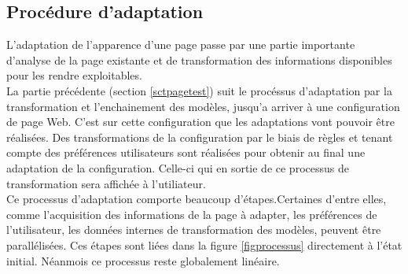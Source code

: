 \documentclass[french,a4paper]{report}
\begin{document}
{\subsection{Procédure d'adaptation}
L'adaptation de l'apparence d'une page passe par une partie importante
d'analyse de la page existante et de transformation des informations
disponibles pour les rendre exploitables.\\
La partie précédente (section \ref{sctpagetest}) suit le procéssus d'adaptation
par la transformation et l'enchainement des modèles, jusqu'a arriver à une configuration
de page Web. C'est sur cette configuration que les adaptations vont pouvoir être réalisées.
Des transformations de la configuration par le biais de règles et tenant compte des
préférences utilisateurs sont réalisées pour obtenir au final une adaptation de la
configuration. Celle-ci qui en sortie de ce processus de transformation sera affichée à
l'utiliateur.\\
Ce processus d'adaptation comporte beaucoup d'étapes.Certaines d'entre elles, comme l'acquisition
des informations de la page à adapter, les préférences de l'utilisateur, les données internes de
transformation des modèles, peuvent être parallélisées. Ces étapes sont liées dans la figure
\ref{figprocessus} directement à l'état initial. Néanmois ce processus reste globalement linéaire.
\\
\begin{figure}[H]
\centering
{}
\end{figure}}
\end{document}
